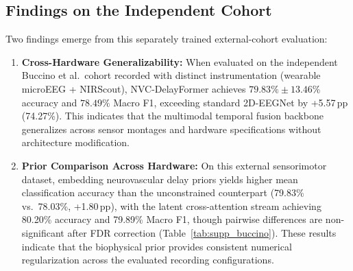 \documentclass[journal]{IEEEtran}
\begin{document}
\subsection{Findings on the Independent Cohort}
Two findings emerge from this separately trained external-cohort evaluation:
\begin{enumerate}
    \item \textbf{Cross-Hardware Generalizability:} When evaluated on the independent Buccino et al.\ cohort recorded with distinct instrumentation (wearable microEEG + NIRScout), NVC-DelayFormer achieves $79.83\% \pm 13.46\%$ accuracy and $78.49\%$ Macro F1, exceeding standard 2D-EEGNet by +5.57\,pp (74.27\%). This indicates that the multimodal temporal fusion backbone generalizes across sensor montages and hardware specifications without architecture modification.
    \item \textbf{Prior Comparison Across Hardware:} On this external sensorimotor dataset, embedding neurovascular delay priors yields higher mean classification accuracy than the unconstrained counterpart (79.83\% vs.\ 78.03\%, +1.80\,pp), with the latent cross-attention stream achieving 80.20\% accuracy and 79.89\% Macro F1, though pairwise differences are non-significant after FDR correction (Table~\ref{tab:supp_buccino}). These results indicate that the biophysical prior provides consistent numerical regularization across the evaluated recording configurations.
\end{enumerate}



\end{document}
